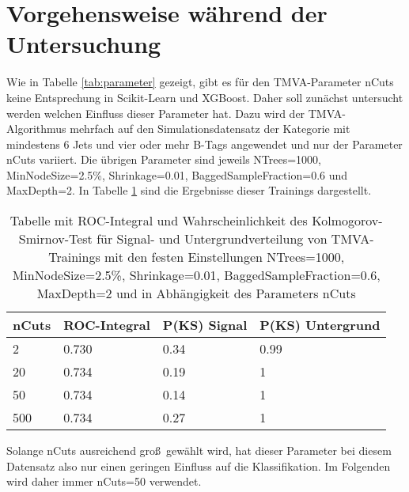 \section{Vorgehensweise w\"ahrend der Untersuchung}
\label{ch:Vergleich:sec:Vorgehensweise}

Wie in Tabelle \ref{tab:parameter} gezeigt, gibt es f\"ur den TMVA-Parameter nCuts keine Entsprechung in Scikit-Learn und XGBoost. Daher soll zun\"achst untersucht werden welchen Einfluss dieser Parameter hat. Dazu wird der TMVA-Algorithmus mehrfach auf den Simulationsdatensatz der Kategorie mit mindestens 6 Jets und vier oder mehr B-Tags angewendet und nur der Parameter nCuts variiert. Die \"ubrigen Parameter sind jeweils NTrees=1000, MinNodeSize=2.5\%, Shrinkage=0.01, BaggedSampleFraction=0.6 und MaxDepth=2.
In Tabelle \ref{tab:nCuts} sind die Ergebnisse dieser Trainings dargestellt.

\begin{table}[tbp]\parbox{12cm}{
  \caption[Variation des TMVA-nCuts-Parameters]{Tabelle mit ROC-Integral und Wahrscheinlichkeit des Kolmogorov-Smirnov-Test f\"ur Signal- und Untergrundverteilung von TMVA-Trainings mit den festen Einstellungen NTrees=1000, MinNodeSize=2.5\%, Shrinkage=0.01, BaggedSampleFraction=0.6, MaxDepth=2 und in Abh\"angigkeit des Parameters nCuts}%
  }\label{tab:nCuts}
  \begin{center}
  \begin{tabular}{llll}
  \hline
  nCuts & ROC-Integral & P(KS) Signal & P(KS) Untergrund\\
  \hline
  \num{2} & \num{0,730} & \num{0,34} & \num{0,99}\\
 \num{20} & \num{0,734} & \num{0,19} & \num{1}\\
 \num{50} & \num{0,734} & \num{0,14} & \num{1}\\
\num{500} & \num{0,734} & \num{0,27} & \num{1}\\
  \hline
  \end{tabular}
  \end{center}
\end{table}

Solange nCuts ausreichend gro\ss~gew\"ahlt wird, hat dieser Parameter bei diesem Datensatz also nur einen geringen Einfluss auf die Klassifikation. Im Folgenden wird daher immer nCuts=\num{50} verwendet.

